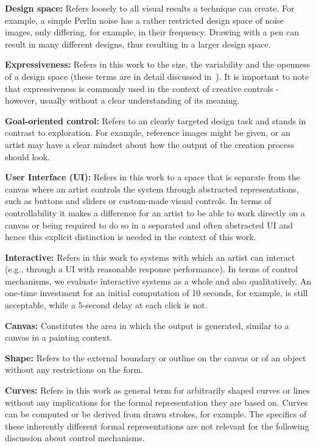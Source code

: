 \textbf{Design space:} Refers loosely to all visual results a technique can create. For example, a simple Perlin noise has a rather restricted design space of noise images, only differing, for example, in their frequency. Drawing with a pen can result in many different designs, thus resulting in a larger design space.


\textbf{Expressiveness:} Refers in this work to the size, the variability and the openness of a design space (these terms are in detail discussed in~). It is important to note that expressiveness is commonly used in the context of creative controls - however, usually without a clear understanding of its meaning.

\textbf{Goal-oriented control:} Refers to an clearly targeted design task and stands in contrast to exploration. For example, reference images might be given, or an artist may have a clear mindset about how the output of the creation process should look.

\textbf{User Interface (UI):} Refers in this work to a space that is separate from the canvas where an artist controls the system through abstracted representations, such as buttons and sliders or custom-made visual controls. In terms of controllability it makes a difference for an artist to be able to work directly on a canvas or being required to do so in a separated and often abstracted UI and hence this explicit distinction is needed in the context of this work.

\textbf{Interactive:} Refers in this work to systems with which an artist can interact (e.g., through a UI with reasonable response performance). In terms of control mechanisms, we evaluate interactive systems as a whole and also qualitatively. An one-time investment for an initial computation of 10 seconds, for example, is still acceptable, while a 5-second delay at each click is not.

\textbf{Canvas:} Constitutes the area in which the output is generated, similar to a canvas in a painting context.

\textbf{Shape:} Refers to the external boundary or outline on the canvas or of an object without any restrictions on the form. 

\textbf{Curves:} Refers in this work as general term for arbitrarily shaped curves or lines without any implications for the formal representation they are based on. Curves can be computed or be derived from drawn strokes, for example. The specifics of these inherently different formal representations are not relevant for the following discussion about control mechanisms.

